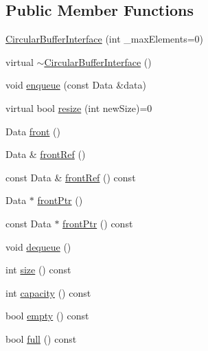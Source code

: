 \subsection*{Public Member Functions}
\begin{CompactItemize}
\item 
\hyperlink{class_j_g_t_l_1_1_circular_buffer_interface_abf78d1a386ecba4d20d5153c52e14f7}{Circular\-Buffer\-Interface} (int \_\-max\-Elements=0)
\item 
virtual \hyperlink{class_j_g_t_l_1_1_circular_buffer_interface_ab1efe15a8613de6b499f4165f3eb369}{$\sim$Circular\-Buffer\-Interface} ()
\item 
void \hyperlink{class_j_g_t_l_1_1_circular_buffer_interface_3de938116256fe2b2db95f8f0d55ced9}{enqueue} (const Data \&data)
\item 
virtual bool \hyperlink{class_j_g_t_l_1_1_circular_buffer_interface_c6976a1811fdeb5b1810e379022f67ba}{resize} (int new\-Size)=0
\item 
Data \hyperlink{class_j_g_t_l_1_1_circular_buffer_interface_0c7032f7235fc559deca9382329df1d7}{front} ()
\item 
Data \& \hyperlink{class_j_g_t_l_1_1_circular_buffer_interface_6d5f296bf6f8a83d6c778d0dc67c119c}{front\-Ref} ()
\item 
const Data \& \hyperlink{class_j_g_t_l_1_1_circular_buffer_interface_b489be5b2b397fa2c17d804861787a90}{front\-Ref} () const
\item 
Data $\ast$ \hyperlink{class_j_g_t_l_1_1_circular_buffer_interface_f2d1a7a2aa153a637f09af061c94faab}{front\-Ptr} ()
\item 
const Data $\ast$ \hyperlink{class_j_g_t_l_1_1_circular_buffer_interface_09caa74b3e297749a06316b04c6fcfbf}{front\-Ptr} () const
\item 
void \hyperlink{class_j_g_t_l_1_1_circular_buffer_interface_c51208639f563639b965b860111c590a}{dequeue} ()
\item 
int \hyperlink{class_j_g_t_l_1_1_circular_buffer_interface_00e36734faa3138a061f31c523dfb01b}{size} () const
\item 
int \hyperlink{class_j_g_t_l_1_1_circular_buffer_interface_3125c67d85e0345f68b9f6aefdfb968c}{capacity} () const
\item 
bool \hyperlink{class_j_g_t_l_1_1_circular_buffer_interface_9c2a55866f731c40ee278835996c35fb}{empty} () const
\item 
bool \hyperlink{class_j_g_t_l_1_1_circular_buffer_interface_4f8940cb0b82b7ba6b5967f397fda1d1}{full} () const
\item 

\end{CompactItemize}
